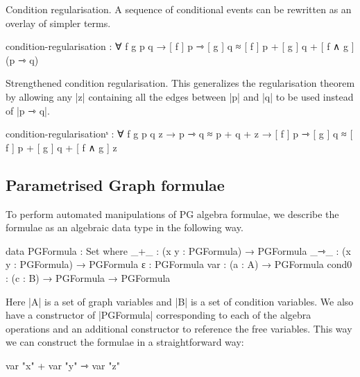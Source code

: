 Condition regularisation. A sequence of conditional events can be rewritten as an overlay of simpler terms.
\begin{code}
  condition-regularisation : ∀ f g p q → 
    [ f ] p ⇾ [ g ] q ≈ [ f ] p + [ g ] q + [ f ∧ g ] (p ⇾ q)
\end{code}

Strengthened condition regularisation. This generalizes the regularisation theorem by allowing any |z| containing all the edges between |p| and |q| to be used instead of |p ⇾ q|.
\begin{code}
  condition-regularisationˢ : ∀ f g p q z
                              → p ⇾ q ≈ p + q + z
                              → [ f ] p ⇾ [ g ] q ≈ [ f ] p + [ g ] q + [ f ∧ g ] z
\end{code}

\subsection{Parametrised Graph formulae}

To perform automated manipulations of PG algebra formulae, we describe the formulae as an algebraic data type in the following way.



\begin{code}
 data PGFormula : Set where
  _+_ : (x y : PGFormula) → PGFormula
  _⇾_ : (x y : PGFormula) → PGFormula
  ε : PGFormula
  var : (a : A) → PGFormula
  cond0 : (c : B) → PGFormula → PGFormula
\end{code}


Here |A| is a set of graph variables and |B| is a set of condition variables.
We also have a constructor of |PGFormula| corresponding to each of the algebra operations and an additional constructor to reference the free variables.
This way we can construct the formulae in a straightforward way: 

\begin{code}
var "x" + var "y" ⇾ var "z"
\end{code}


